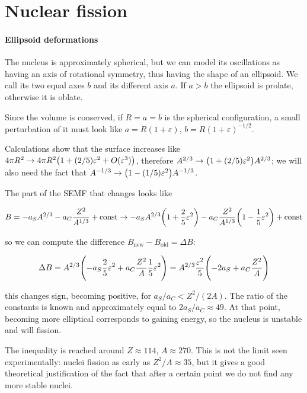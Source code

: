 \documentclass{article}
\begin{document}
\section{Nuclear fission}

\paragraph{Ellipsoid deformations}

The nucleus is approximately spherical, but we can model its oscillations as having an axis of rotational symmetry, thus having the shape of an ellipsoid. We call its two equal axes \(b\) and its different axis \(a\). If \(a>b\) the ellipsoid is prolate, otherwise it is oblate.

Since the volume is conserved, if \(R=a=b\) is the spherical configuration, a small perturbation of it must look like \(a = R(1+ \varepsilon )\), \(b = R(1+\varepsilon)^{-1/2}\).

Calculations show that the surface increases like \( 4 \pi R^2 \rightarrow 4 \pi R^2 \qty(1  + (2/5) \varepsilon^2 + O(\varepsilon^3))\), therefore \(A^{2/3} \rightarrow \qty(1+ (2/5)\varepsilon^2) A^{2/3}\); we will also need the fact that \(A^{-1/3} \rightarrow \qty(1-(1/5)\varepsilon^2) A^{-1/3}\).

The part of the SEMF that changes looks like

\begin{equation}
    B = - a_S A^{2/3} - a_C \frac{Z^2}{A^{1/3}} +  \text{const}
    \rightarrow - a_S A^{2/3} \qty(1+ \frac 25 \varepsilon^2)  - a_C \frac{Z^2}{A^{1/3}} \qty(1-\frac 15 \varepsilon^2)+  \text{const}
\end{equation}

so we can compute the difference \(B_ \text{new} - B _ \text{old} = \Delta B\):

\begin{equation}
    \Delta B
    = A^{2/3} \qty( - a_S  \frac 25 \varepsilon^2 + a_C \frac{Z^2}{A} \frac 15 \varepsilon^2)
    = A^{2/3} \frac{\varepsilon^2}{5} \qty(-2a_S + a_C \frac{Z^2}{A})
\end{equation}

this changes sign, becoming positive, for \(a_S / a_C < Z^2 / (2A)\). The ratio of the constants is known and approximately equal to \(2a_S /a_C \approx 49\). At that point, becoming more elliptical corresponds to gaining energy, so the nucleus is unstable and will fission.

The inequality is reached around \(Z \approx 114\), \(A \approx 270\). This is not the limit seen experimentally: nuclei fission as early as \(Z^2 / A \approx 35\), but it gives a good theoretical justification of the fact that after a certain point we do not find any more stable nuclei.
\end{document}
